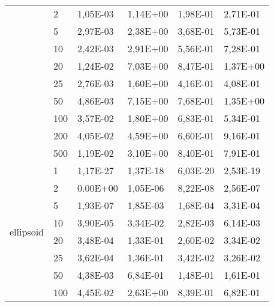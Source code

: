 \begin{longtable}[c]{|p{3.5cm}|l|l|l|l|l|}
                                        & 2         & 1,05E-03   & 1,14E+00   & 1,98E-01   & 2,71E-01  \\ \cline{2-6} 
                                        & 5         & 2,97E-03   & 2,38E+00   & 3,68E-01   & 5,73E-01  \\ \cline{2-6} 
                                        & 10        & 2,42E-03   & 2,91E+00   & 5,56E-01   & 7,28E-01  \\ \cline{2-6} 
                                        & 20        & 1,24E-02   & 7,03E+00   & 8,47E-01   & 1,37E+00  \\ \cline{2-6} 
                                        & 25        & 2,76E-03   & 1,60E+00   & 4,16E-01   & 4,08E-01  \\ \cline{2-6} 
                                        & 50        & 4,86E-03   & 7,15E+00   & 7,68E-01   & 1,35E+00  \\ \cline{2-6} 
                                        & 100       & 3,57E-02   & 1,80E+00   & 6,83E-01   & 5,34E-01  \\ \cline{2-6} 
                                        & 200       & 4,05E-02   & 4,59E+00   & 6,60E-01   & 9,16E-01  \\ \cline{2-6} 
                                        & 500       & 1,19E-02   & 3,10E+00   & 8,40E-01   & 7,91E-01  \\ \hline
\multirow[t]{10}{*}{ellipsoid}             & 1         & 1,17E-27   & 1,37E-18   & 6,03E-20   & 2,53E-19  \\ \cline{2-6} 
                                        & 2         & 0.00E+00   & 1,05E-06   & 8,22E-08   & 2,56E-07  \\ \cline{2-6} 
                                        & 5         & 1,93E-07   & 1,85E-03   & 1,68E-04   & 3,31E-04  \\ \cline{2-6} 
                                        & 10        & 3,90E-05   & 3,34E-02   & 2,82E-03   & 6,14E-03  \\ \cline{2-6} 
                                        & 20        & 3,48E-04   & 1,33E-01   & 2,60E-02   & 3,34E-02  \\ \cline{2-6} 
                                        & 25        & 3,62E-04   & 1,36E-01   & 3,42E-02   & 3,26E-02  \\ \cline{2-6} 
                                        & 50        & 4,38E-03   & 6,84E-01   & 1,48E-01   & 1,61E-01  \\ \cline{2-6} 
                                        & 100       & 4,45E-02   & 2,63E+00   & 8,39E-01   & 6,82E-01  \\ \cline{2-6} 

\end{longtable}
